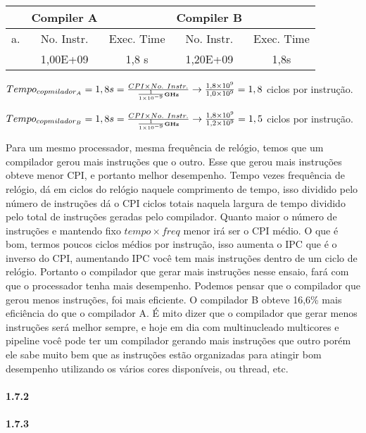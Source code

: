\documentclass{article}
\begin{document}
\begin{tabular}{|c|c|c|c|c|}
\hline  & Compiler A &  & Compiler B &  \\
\hline a. & No. Instr. & Exec. Time & No. Instr. & Exec. Time \\
\hline  & 1,00E+09 & 1,8 s & 1,20E+09 & 1,8s \\
\hline
\end{tabular}

$Tempo_{copmilador_{A}} = 1,8s = \frac{CPI \times No.\ Instr.}{\frac{1}{1 \times
10^{-9}} \textbf{\tiny GHz}} \rightarrow \frac{1,8 \times 10^{9}}{1,0 \times
10^{9}} = 1,8$ ciclos por instrução.

$Tempo_{copmilador_{B}} = 1,8s = \frac{CPI \times No.\ Instr.}{\frac{1}{1 \times
10^{-9}} \textbf{\tiny GHz}} \rightarrow \frac{1,8 \times 10^{9}}{1,2 \times
10^{9}} = 1,5$ ciclos por instrução.

Para um mesmo processador, mesma frequência de relógio, temos que um compilador
gerou mais instruções que o outro. Esse que gerou mais instruções obteve menor
CPI, e portanto melhor desempenho. Tempo vezes frequência de relógio, dá em
ciclos do relógio naquele comprimento de tempo, isso dividido pelo número de
instruções dá o CPI ciclos totais naquela largura de tempo dividido pelo total
de instruções geradas pelo compilador. Quanto maior o número de instruções e
mantendo fixo $tempo \times freq$ menor irá ser o CPI médio. O que é bom, termos
poucos ciclos médios por instrução, isso aumenta o IPC que é o inverso do CPI,
aumentando IPC você tem mais instruções dentro de um ciclo de relógio. Portanto
o compilador que gerar mais instruções nesse ensaio, fará com que o processador
tenha mais desempenho. Podemos pensar que o compilador que gerou menos
instruções, foi mais eficiente. O compilador B obteve 16,6\% mais eficiência do
que o compilador A. É mito dizer que o compilador que gerar menos instruções
será melhor sempre, e hoje em dia com multinucleado multicores e pipeline você
pode ter um compilador gerando mais instruções que outro porém ele sabe muito
bem que as instruções estão organizadas para atingir bom desempenho utilizando
os vários cores disponíveis, ou thread, etc.

\paragraph{1.7.2}
\paragraph{1.7.3}
\end{document}
